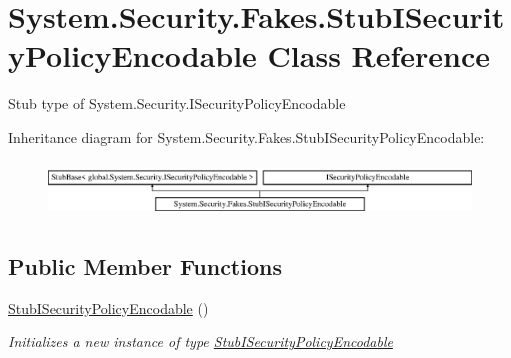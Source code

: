 \hypertarget{class_system_1_1_security_1_1_fakes_1_1_stub_i_security_policy_encodable}{\section{System.\-Security.\-Fakes.\-Stub\-I\-Security\-Policy\-Encodable Class Reference}
\label{class_system_1_1_security_1_1_fakes_1_1_stub_i_security_policy_encodable}
}


Stub type of System.\-Security.\-I\-Security\-Policy\-Encodable 


Inheritance diagram for System.\-Security.\-Fakes.\-Stub\-I\-Security\-Policy\-Encodable\-:\begin{figure}[H]
\begin{center}
\leavevmode
\includegraphics[height=1.493333cm]{class_system_1_1_security_1_1_fakes_1_1_stub_i_security_policy_encodable}
\end{center}
\end{figure}
\subsection*{Public Member Functions}
\begin{DoxyCompactItemize}
\item 
\hyperlink{class_system_1_1_security_1_1_fakes_1_1_stub_i_security_policy_encodable_ac8034ebc02127ab4e6e8b89fbe111815}{Stub\-I\-Security\-Policy\-Encodable} ()
\begin{DoxyCompactList}\small\item\em Initializes a new instance of type \hyperlink{class_system_1_1_security_1_1_fakes_1_1_stub_i_security_policy_encodable}{Stub\-I\-Security\-Policy\-Encodable}\end{DoxyCompactList}\end{DoxyCompactItemize}
